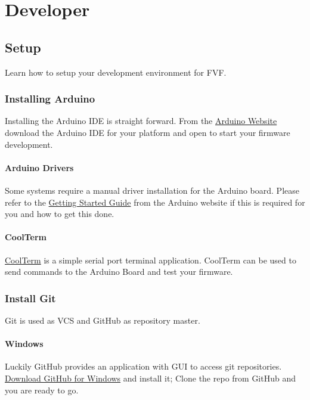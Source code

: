 \part{Developer}

\chapter{Setup}
\label{development/setup:fugue}\label{development/setup:setup}\label{development/setup::doc}
Learn how to setup your development environment for FVF.


\section{Installing Arduino}
\label{development/setup:installing-arduino}
Installing the Arduino IDE is straight forward. From the \href{http://www.arduino.cc/en/Main/Software}{Arduino Website} download the Arduino IDE for your platform and open  to start your firmware development.


\subsection{Arduino Drivers}
\label{development/setup:arduino-drivers}\label{development/setup:arduino-website}
Some systems require a manual driver installation for the Arduino board. Please refer to the \href{http://www.arduino.cc/en/Guide/HomePage}{Getting Started Guide} from the Arduino website if this is required for you and how to get this done.


\subsection{CoolTerm}
\label{development/setup:coolterm}\label{development/setup:getting-started-guide}
\href{http://freeware.the-meiers.org/}{CoolTerm} is a simple serial port terminal application. CoolTerm can be used to send commands to the Arduino Board and test your firmware.


\section{Install Git}
\label{development/setup:install-git}\label{development/setup:id1}
Git is used as VCS and GitHub as repository master.


\subsection{Windows}
\label{development/setup:windows}
Luckily GitHub provides an application with GUI to access git repositories. \href{https://windows.github.com/}{Download GitHub for Windows} and install it; Clone the repo from GitHub and you are ready to go.


